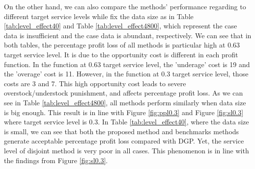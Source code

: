 \documentclass{article}
\begin{document}
\begin{table}[ht]
\caption{Size effect at 0.3 target service level}
\label{tab:size_effect0.3}
\centering {} 
\end{table}

On the other hand, we can also compare the methods' performance regarding to different target service levels while fix the data size as in Table \ref{tab:level_effect40} and Table \ref{tab:level_effect4800}, which represent the case data is insufficient and the case data is abundant, respectively. We can see that in both tables, the percentage profit loss of all methods is particular high at 0.63 target service level. It is due to the opportunity cost is different in each profit function. In the function at 0.63 target service level, the 'underage' cost is 19 and the 'overage' cost is 11. However, in the function at 0.3 target service level, those costs are 3 and 7. This high opportunity cost leads to severe overstock/understock punishment, and affects percentage profit loss. As we can see in Table \ref{tab:level_effect4800}, all methods perform similarly when data size is big enough. This result is in line with Figure \ref{fig:ppl0.3} and Figure \ref{fig:sl0.3} where target service level is 0.3. In Table \ref{tab:level_effect40}, where the data size is small, we can see that both the proposed method and benchmarks methods generate acceptable percentage profit loss compared with DGP. Yet, the service level of disjoint method is very poor in all cases. This phenomenon is in line with the findings from Figure \ref{fig:sl0.3}.
\end{document}
